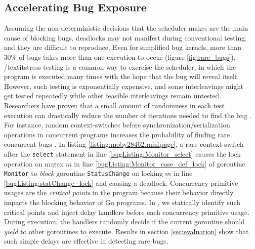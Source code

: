 \subsection{Accelerating Bug Exposure}
Assuming the non-deterministic decisions that the scheduler makes are the main cause of blocking bugs, deadlocks may not manifest during conventional testing, and they are difficult to reproduce.
%
Even for simplified bug kernels, more than 30\% of bugs takes more than one execution to occur (figure \ref{fig:rare_bugs}).
%
/textit{stress testing} is a common way to exercise the scheduler, in which the program is executed many times with the hope that the bug will reveal itself.
%
However, such testing is exponentially expensive, and some interleavings might get tested repeatedly while other feasible interleavings remain untested.
%
Researchers have proven that a small amount of randomness in each test execution can drastically reduce the number of iterations needed to find the bug \cite{emmi-delayBounded-popl11}.
%
For instance, random context-switches before synchronization/serialization operations in concurrent programs increases the probability of finding rare concurrent bugs \cite{burckhardt-depthBug-asplos10}.
%
In listing \ref{listing:moby28462.minipage}, a rare context-switch after the \texttt{select} statement in line \ref{bugListing:Monitor_select} causes the lock operation on mutex $m$ in line \ref{bugListing:Monitor_case_def_lock} of goroutine \texttt{Monitor} to \textit{block} goroutine \texttt{StatusChange} on locking $m$ in line \ref{bugListing:statChange_lock} and causing a deadlock.
%
Concurrency primitive usages are the \textit{critical points} in the program because their behavior directly impacts the blocking behavior of Go programs.
%
In \goat, we statically identify such critical points and inject delay handlers before each concurrency primitive usage.
%
During execution, the handlers randomly decide if the current goroutine should \textit{yield} to other goroutines to execute.
%
Results in section \ref{sec:evaluation} show that such simple delays are effective in detecting rare bugs.

